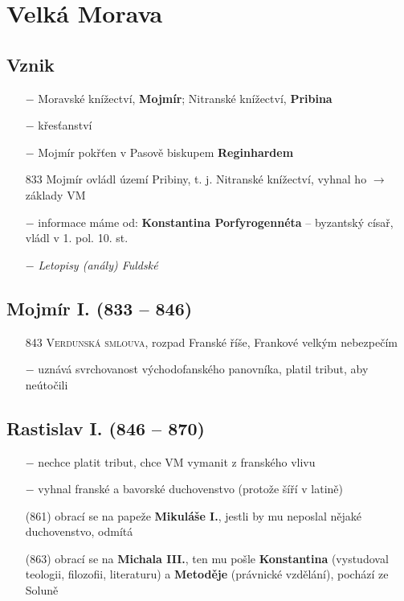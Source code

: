 \documentclass{article}
\begin{document}
\section*{Velká Morava}

\subsection*{Vznik}
\begin{itemize}
    \vspace{-0.5em}
    \setlength\itemsep{0.15em}
    \item[$-$] Moravské knížectví, \textbf{Mojmír}; Nitranské knížectví, \textbf{Pribina}
    \item[$-$] křesťanství
    \item[$-$] Mojmír pokřťen v Pasově biskupem \textbf{Reginhardem}
    \item[833] Mojmír ovládl území Pribiny, t. j. Nitranské knížectví, vyhnal ho $\rightarrow$ základy VM
    \item[$-$] informace máme od: \textbf{Konstantina Porfyrogennéta} -- byzantský císař, vládl v 1. pol. 10. st.
    \item[$-$] \textit{Letopisy (anály) Fuldské}
\end{itemize}

\subsection*{Mojmír I. (833 -- 846)}
\begin{itemize}
    \vspace{-0.5em}
    \setlength\itemsep{0.15em}
    \item[843] \textsc{Verdunská smlouva}, rozpad Franské říše, Frankové velkým nebezpečím
    \item[$-$] uznává svrchovanost východofanského panovníka, platil tribut, aby neútočili
\end{itemize}

\subsection*{Rastislav I. (846 -- 870)}
\begin{itemize}
    \vspace{-0.5em}
    \setlength\itemsep{0.15em}
    \item[$-$] nechce platit tribut, chce VM vymanit z franského vlivu
    \item[$-$] vyhnal franské a bavorské duchovenstvo (protože šíří v latině)
    \item[(861)] obrací se na papeže \textbf{Mikuláše I.}, jestli by mu neposlal nějaké duchovenstvo, odmítá
    \item[(863)] obrací se na \textbf{Michala III.}, ten mu pošle \textbf{Konstantina} (vystudoval teologii, filozofii, literaturu) a \textbf{Metoděje} (právnické vzdělání), pochází ze Soluně
\end{itemize}
\end{document}
